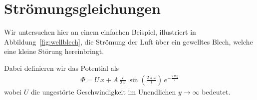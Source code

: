 %
%
%
%
\section{Strömungsgleichungen\label{ueberschall:stroemungsgleichung}}
Wir untersuchen hier an einem einfachen Beispiel, 
illustriert in Abbildung~\ref{fig:wellblech},
die Strömung der Luft über ein gewelltes Blech,
welche eine kleine Störung hereinbringt.

Dabei definieren wir das Potential als
\begin{align*}
    \Phi
    =
    U\,x + A\,\frac{l}{2\,\pi}\,\sin\left(\frac{2\,\pi\,x}{l}\right)
    \,e^{-\frac{2\,\pi\,y}{l}}
\end{align*}
wobei $U$ die ungestörte Geschwindigkeit im 
Unendlichen $y\rightarrow\infty$ bedeutet.

